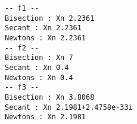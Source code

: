 \begin{lstlisting}
-- f1 --
Bisection : Xn 2.2361
Secant : Xn 2.2361
Newtons : Xn 2.2361
-- f2 --
Bisection : Xn 7
Secant : Xn 0.4
Newtons : Xn 0.4
-- f3 --
Bisection : Xn 3.8068
Secant : Xn 2.1981+2.4758e-33i
Newtons : Xn 2.1981	
\end{lstlisting}
